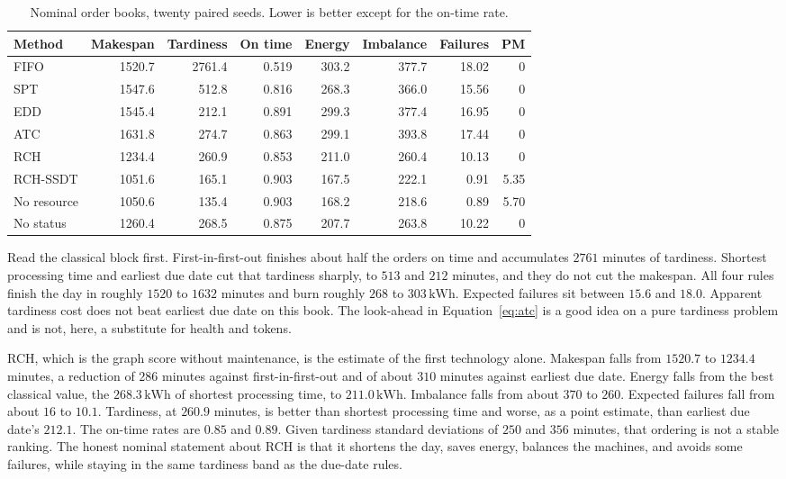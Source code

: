 \begin{table}[ht]
\centering
\caption{Nominal order books, twenty paired seeds. Lower is better except for the on-time rate.}
\label{tab:nominal}
\small
\begin{tabular}{lrrrrrrr}
\toprule
Method & Makespan & Tardiness & On time & Energy & Imbalance & Failures & PM \\
\midrule
FIFO & 1520.7 & 2761.4 & 0.519 & 303.2 & 377.7 & 18.02 & 0 \\
SPT & 1547.6 & 512.8 & 0.816 & 268.3 & 366.0 & 15.56 & 0 \\
EDD & 1545.4 & 212.1 & 0.891 & 299.3 & 377.4 & 16.95 & 0 \\
ATC & 1631.8 & 274.7 & 0.863 & 299.1 & 393.8 & 17.44 & 0 \\
RCH & 1234.4 & 260.9 & 0.853 & 211.0 & 260.4 & 10.13 & 0 \\
RCH-SSDT & 1051.6 & 165.1 & 0.903 & 167.5 & 222.1 & 0.91 & 5.35 \\
No resource & 1050.6 & 135.4 & 0.903 & 168.2 & 218.6 & 0.89 & 5.70 \\
No status & 1260.4 & 268.5 & 0.875 & 207.7 & 263.8 & 10.22 & 0 \\
\bottomrule
\end{tabular}
\end{table}

Read the classical block first. First-in-first-out finishes about half the orders on time and accumulates \(2761\) minutes of tardiness. Shortest processing time and earliest due date cut that tardiness sharply, to \(513\) and \(212\) minutes, and they do not cut the makespan. All four rules finish the day in roughly \(1520\) to \(1632\) minutes and burn roughly \(268\) to \(303\,\mathrm{kWh}\). Expected failures sit between \(15.6\) and \(18.0\). Apparent tardiness cost does not beat earliest due date on this book. The look-ahead in Equation~\eqref{eq:atc} is a good idea on a pure tardiness problem and is not, here, a substitute for health and tokens.

RCH, which is the graph score without maintenance, is the estimate of the first technology alone. Makespan falls from \(1520.7\) to \(1234.4\) minutes, a reduction of \(286\) minutes against first-in-first-out and of about \(310\) minutes against earliest due date. Energy falls from the best classical value, the \(268.3\,\mathrm{kWh}\) of shortest processing time, to \(211.0\,\mathrm{kWh}\). Imbalance falls from about \(370\) to \(260\). Expected failures fall from about \(16\) to \(10.1\). Tardiness, at \(260.9\) minutes, is better than shortest processing time and worse, as a point estimate, than earliest due date's \(212.1\). The on-time rates are \(0.85\) and \(0.89\). Given tardiness standard deviations of \(250\) and \(356\) minutes, that ordering is not a stable ranking. The honest nominal statement about RCH is that it shortens the day, saves energy, balances the machines, and avoids some failures, while staying in the same tardiness band as the due-date rules.

